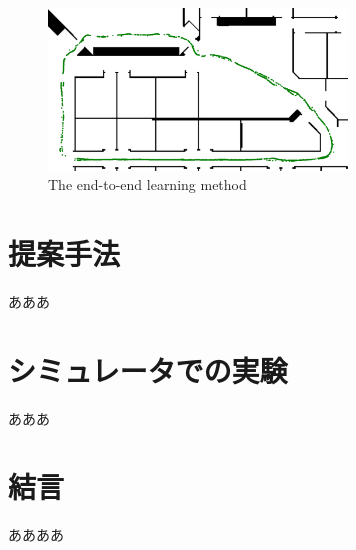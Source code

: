 \documentclass{jarticle}
\begin{document}
\begin{figure}[h!]
  \centering
   \includegraphics[height=43mm]{./png/analy.png}
   \caption{The end-to-end learning method}
\end{figure}


\section{提案手法}
あああ\\

\newpage

\section{シミュレータでの実験}
あああ\\

\section{結言}
ああああ
\end{document}

